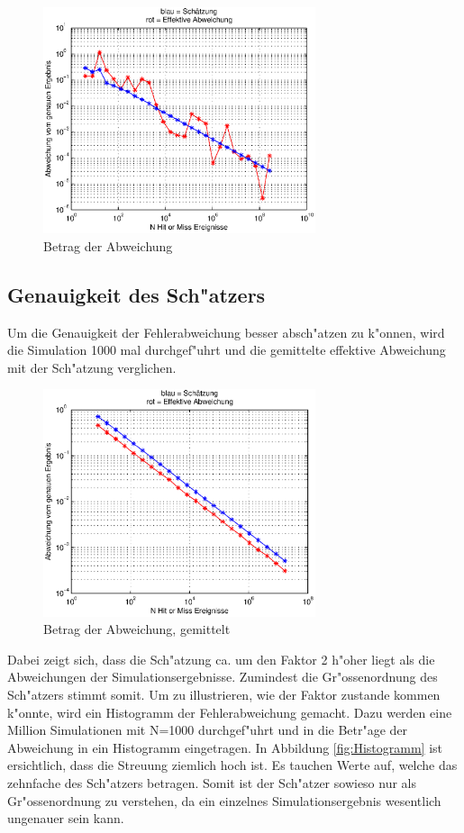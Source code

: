 \begin{refsection}
\begin{figure}[ht!]
    \centering
    \includegraphics[width=8cm]{montecarlo/images/Fehler.eps}
    \caption{Betrag der Abweichung}
    \label{fig:Fehler}
\end{figure}

\subsection{Genauigkeit des Sch"atzers}

Um die Genauigkeit der Fehlerabweichung besser absch"atzen zu k"onnen,
wird die Simulation 1000 mal durchgef"uhrt und die gemittelte effektive
Abweichung mit der Sch"atzung verglichen.

\begin{figure}[ht!]
    \centering
    \includegraphics[width=8cm]{montecarlo/images/Fehler_gemittelt.eps}
    \caption{Betrag der Abweichung, gemittelt}
    \label{fig:Fehler_gemittelt}
\end{figure}

Dabei zeigt sich, dass die Sch"atzung ca. um den Faktor 2 h"oher liegt als
die Abweichungen der Simulationsergebnisse. Zumindest die Gr"ossenordnung
des Sch"atzers stimmt somit. Um zu illustrieren, wie der Faktor zustande
kommen k"onnte, wird ein Histogramm der Fehlerabweichung gemacht. Dazu
werden eine Million Simulationen mit N=1000 durchgef"uhrt und in die
Betr"age der Abweichung in ein Histogramm eingetragen. In Abbildung
\ref{fig:Histogramm} ist ersichtlich, dass die Streuung ziemlich
hoch ist. Es tauchen Werte auf, welche das zehnfache des Sch"atzers
betragen. Somit ist der Sch"atzer sowieso nur als Gr"ossenordnung zu
verstehen, da ein einzelnes Simulationsergebnis wesentlich ungenauer
sein kann.


\end{refsection}
